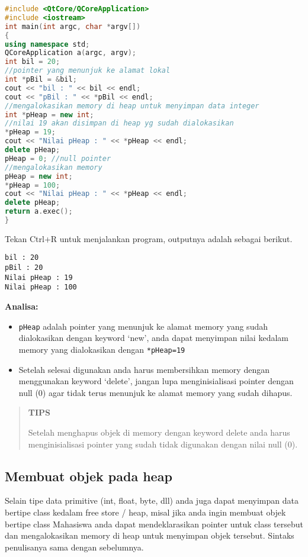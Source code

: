 \begin{lstlisting}[language=c++]
#include <QtCore/QCoreApplication>
#include <iostream>
int main(int argc, char *argv[])
{
using namespace std;
QCoreApplication a(argc, argv);
int bil = 20;
//pointer yang menunjuk ke alamat lokal
int *pBil = &bil;
cout << "bil : " << bil << endl;
cout << "pBil : " << *pBil << endl;
//mengalokasikan memory di heap untuk menyimpan data integer
int *pHeap = new int;
//nilai 19 akan disimpan di heap yg sudah dialokasikan
*pHeap = 19;
cout << "Nilai pHeap : " << *pHeap << endl;
delete pHeap;
pHeap = 0; //null pointer
//mengalokasikan memory
pHeap = new int;
*pHeap = 100;
cout << "Nilai pHeap : " << *pHeap << endl;
delete pHeap;
return a.exec();
}
\end{lstlisting}

Tekan Ctrl+R untuk menjalankan program, outputnya adalah sebagai
berikut.

\begin{verbatim}
bil : 20
pBil : 20
Nilai pHeap : 19
Nilai pHeap : 100
\end{verbatim}

\textbf{Analisa:}

\begin{itemize}
\tightlist
\item
  \texttt{pHeap} adalah pointer yang menunjuk ke alamat memory yang
  sudah dialokasikan dengan keyword `new', anda dapat menyimpan nilai
  kedalam memory yang dialokasikan dengan \texttt{*pHeap=19}
\item
  Setelah selesai digunakan anda harus membersihkan memory dengan
  menggunakan keyword `delete', jangan lupa menginisialisasi pointer
  dengan null (0) agar tidak terus menunjuk ke alamat memory yang sudah
  dihapus.
\end{itemize}


 
 \begin{quotation}
 	 \textbf{TIPS}
 	 
 	 Setelah
 	 menghapus objek di memory dengan keyword delete anda harus
 	 menginisialisasi pointer yang sudah tidak digunakan dengan nilai null
 	 (0).
 \end{quotation} 

\subsection{Membuat objek pada heap}\label{membuat-objek-pada-heap}

Selain tipe data primitive (int, float, byte, dll) anda juga dapat
menyimpan data bertipe class kedalam free store / heap, misal jika anda
ingin membuat objek bertipe class Mahasiswa anda dapat mendeklarasikan
pointer untuk class tersebut dan mengalokasikan memory di heap untuk
menyimpan objek tersebut. Sintaks penulisanya sama dengan sebelumnya.

